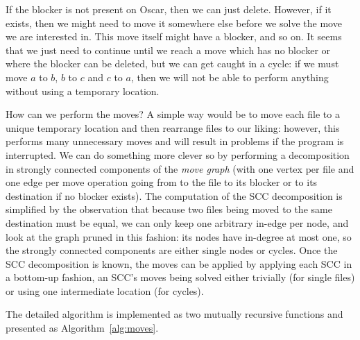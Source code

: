 \documentclass[11pt]{llncs}
\begin{document}
If the blocker is not present on Oscar, then we can just delete. However, if it
exists, then we might need to move it somewhere else before we solve the move we
are interested in. This move itself might have a blocker, and so on. It seems
that we just need to continue until we reach a move which has no blocker or
where the blocker can be deleted, but we can get caught in a cycle: if we must
move $a$ to $b$, $b$ to $c$ and $c$ to $a$, then we will not be able to perform
anything without using a temporary location.

How can we perform the moves? A simple way would be to move each file to a
unique temporary location and then rearrange files to our liking: however, this
performs many unnecessary moves and will result in problems if the program is
interrupted. We can do something more clever so by performing a decomposition in
strongly connected components of the \emph{move graph} (with one vertex per file
and one edge per move operation going from to the file to its blocker or to its
destination if no blocker exists). The computation of the SCC decomposition is
simplified by the observation that because two files being moved to the same
destination must be equal, we can only keep one arbitrary in-edge per node, and
look at the graph pruned in this fashion: its nodes have in-degree at most one,
so the strongly connected components are either single nodes or cycles. Once the
SCC decomposition is known, the moves can be applied by applying each SCC in a
bottom-up fashion, an SCC's moves being solved either trivially (for single
files) or using one intermediate location (for cycles).

The detailed algorithm is implemented as two mutually recursive functions and
presented as Algorithm~\ref{alg:moves}.
\end{document}
